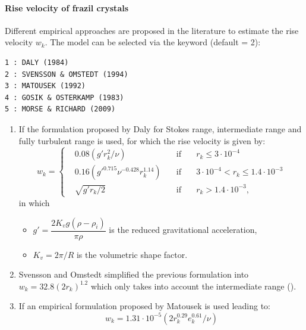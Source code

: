 \paragraph{Rise velocity of frazil crystals}
\label{buoyancy}
Different empirical approaches are proposed in the literature to estimate the rise velocity $w_k$.
The model can be selected via the keyword  (default = 2):
\begin{lstlisting}
1 : DALY (1984)
2 : SVENSSON & OMSTEDT (1994)
3 : MATOUSEK (1992)
4 : GOSIK & OSTERKAMP (1983)
5 : MORSE & RICHARD (2009)
\end{lstlisting}

\begin{enumerate}
\item If  the formulation proposed by Daly
\cite{daly_1984} for Stokes range,
intermediate range and fully turbulent range is used,
for which the rise velocity is given by:
\begin{equation}
w_k =
\left\lbrace
	\begin{matrix}
	& 0.08 ( g' r_k^2 / \nu ) \quad & \text{if} & \quad r_k \leq 3\cdot10^{-4} \\
  & 0.16 ( g'^{0.715} \nu^{-0.428} r_{k}^{1.14} ) \quad & \text{if} & \quad 3\cdot10^{-4} < r_k \leq 1.4\cdot10^{-3} \\
	& \sqrt{g' r_k/2} \quad & \text{if} & \quad r_k > 1.4 \cdot10^{-3},
\end{matrix}
\right.
\label{eq:model:rise_velocity_daly}
\end{equation}
in which
\begin{itemize}
    \item $g'= \dfrac{2 K_v g (\rho-\rho_i)}{\pi \rho}$ is the reduced gravitational acceleration,
	\item $K_v = 2 \pi /R$ is the volumetric shape factor.
\end{itemize}

\item Svensson and Omstedt \cite{Omstedt_1994} simplified the previous formulation into $w_k=32.8(2 r_k)^{1.2}$ which only takes into account the intermediate range ().

\item If  an empirical formulation proposed by
Matousek \cite{matouvsek1992frazil} is used leading to:
\begin{equation}
w_k=1.31\cdot10^{-5}( 2 r_k^{0.29} e_k^{0.61} / \nu )
\end{equation}


\end{enumerate}
